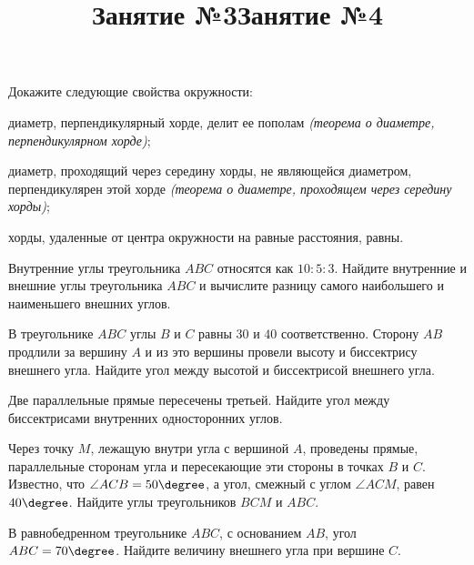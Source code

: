 \newpage
\title{Занятие №3}
\begin{listofex}
	\item Докажите следующие свойства окружности:
	\begin{enumcols}[itemcolumns=1]
		\item диаметр, перпендикулярный хорде, делит ее пополам \textit{(теорема о диаметре, перпендикулярном хорде)};
		\item диаметр, проходящий через середину хорды, не являющейся диаметром, перпендикулярен этой хорде \textit{(теорема о диаметре, проходящем через середину хорды)};
		\item хорды, удаленные от центра окружности на равные расстояния, равны.
	\end{enumcols}
	\item {}
	\item {}
	\item {}
	\item {}
	\item {}
	\item {}
	\item[\loeitem{8*}] 
\end{listofex}
\newpage
\title{Занятие №4}
\begin{listofex}
	\item Внутренние углы треугольника \( ABC \) относятся как \( 10:5:3 \). Найдите внутренние и внешние углы треугольника \( ABC \) и вычислите разницу самого наибольшего и наименьшего внешних углов. 
	\item В треугольнике \( ABC \) углы \( B \) и \( C \) равны \( 30 \) и \( 40 \) соответственно. Сторону \( AB \) продлили за вершину \( A \) и из это вершины провели высоту и биссектрису внешнего угла. Найдите угол между высотой и биссектрисой внешнего угла. 
	\item Две параллельные прямые пересечены третьей. Найдите угол между биссектрисами внутренних односторонних углов. 
	\item Через точку \( M \), лежащую внутри угла с вершиной \( A \), проведены прямые, параллельные сторонам угла и пересекающие эти стороны в точках \( B \) и \( C \). Известно, что \( \angle ACB = 50\degree \), а угол, смежный с углом \( \angle ACM \), равен \( 40\degree \). Найдите углы треугольников \( BCM \) и \( ABC \).
	\item {}
	\item В равнобедренном треугольнике \( ABC \), с основанием \( AB \), угол \(  ABC = 70\degree \). Найдите величину внешнего угла при вершине \( C \). 
	\item[\loeitem{7*}] 
\end{listofex}
